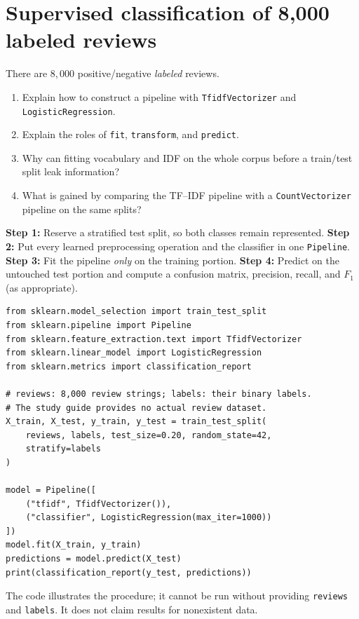 \section{Supervised classification of 8,000 labeled reviews}
\label{sec:ex14}
\begin{problem}
There are $8{,}000$ positive/negative \emph{labeled} reviews.
\begin{enumerate}[label=\textbf{(\alph*)}]
\item Explain how to construct a pipeline with \texttt{TfidfVectorizer} and \texttt{LogisticRegression}.
\item Explain the roles of \texttt{fit}, \texttt{transform}, and \texttt{predict}.
\item Why can fitting vocabulary and IDF on the whole corpus before a train/test split leak information?
\item What is gained by comparing the TF--IDF pipeline with a \texttt{CountVectorizer} pipeline on the same splits?
\end{enumerate}
\end{problem}


\textbf{Step 1:} Reserve a stratified test split, so both classes remain represented. \textbf{Step 2:} Put every learned preprocessing operation and the classifier in one \texttt{Pipeline}. \textbf{Step 3:} Fit the pipeline \emph{only} on the training portion. \textbf{Step 4:} Predict on the untouched test portion and compute a confusion matrix, precision, recall, and $F_1$ (as appropriate).

\begin{lstlisting}
from sklearn.model_selection import train_test_split
from sklearn.pipeline import Pipeline
from sklearn.feature_extraction.text import TfidfVectorizer
from sklearn.linear_model import LogisticRegression
from sklearn.metrics import classification_report

# reviews: 8,000 review strings; labels: their binary labels.
# The study guide provides no actual review dataset.
X_train, X_test, y_train, y_test = train_test_split(
    reviews, labels, test_size=0.20, random_state=42,
    stratify=labels
)

model = Pipeline([
    ("tfidf", TfidfVectorizer()),
    ("classifier", LogisticRegression(max_iter=1000))
])
model.fit(X_train, y_train)
predictions = model.predict(X_test)
print(classification_report(y_test, predictions))
\end{lstlisting}
The code illustrates the procedure; it cannot be run without providing \texttt{reviews} and \texttt{labels}. It does not claim results for nonexistent data.

